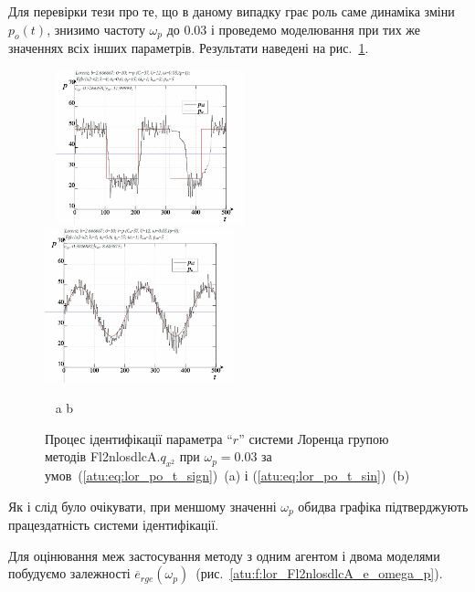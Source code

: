 Для перевірки тези про те, що в даному випадку грає роль саме
динаміка зміни
$ p_o (t) $, знизимо частоту
$ \omega_p $ до
$ 0.03 $ і проведемо моделювання при тих же значеннях всіх інших
параметрів. Результати наведені на рис.~\ref{atu:f:lor_id_Fl2nlosdlcA_003}.

\begin{figure}[ht!]
  \begin{center}
    ~ \hfill
    \includegraphics[width=0.49\textwidth]{p/cha/lor/Fl2nlosdlcA/Fl2nlosdlcA-p_xz_1_wp003.png}
    \hfill
    \includegraphics[width=0.49\textwidth]{p/cha/lor/Fl2nlosdlcA/Fl2nlosdlcA-p_xz_0_wp003.png}
    \hfill ~
  \end{center}
  \vspace{-1.0ex}
  \begin{center}
    ~ \hfill a \hfill\hfill b \hfill ~
  \end{center}
  \vspace{-1.5ex}
\caption{Процес ідентифікації параметра ``$r$'' системи Лоренца групою методів Fl2nlosdlcA.$q_{x^2} $ при $ \omega_p = 0.03 $ за умов~(\ref{atu:eq:lor_po_t_sign})~(a) і (\ref{atu:eq:lor_po_t_sin})~(b)}
\label{atu:f:lor_id_Fl2nlosdlcA_003}
\end{figure}

Як і слід було очікувати, при меншому значенні
$ \omega_p $ обидва графіка підтверджують працездатність системи
ідентифікації.

Для оцінювання меж застосування методу з одним агентом і двома
моделями побудуємо залежності
$\overline{e}_{rge}(\omega_p)$~(рис.~\ref{atu:f:lor_Fl2nlosdlcA_e_omega_p}).

